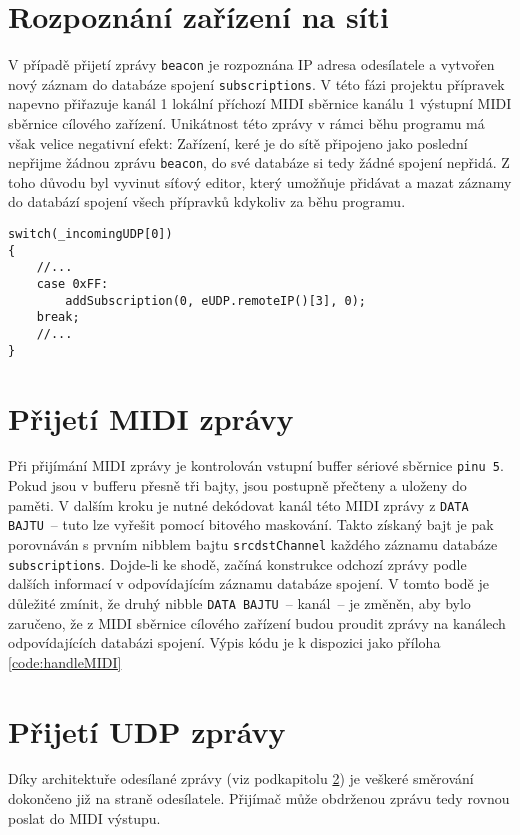 \section{Rozpoznání zařízení na síti}
V případě přijetí zprávy \texttt{beacon} je rozpoznána IP adresa odesílatele a vytvořen nový záznam do databáze spojení \texttt{sub\-scrip\-tions}. V této fázi projektu přípravek napevno přiřazuje kanál 1  lokální příchozí \acs{MIDI} sběrnice kanálu 1 výstupní \acs{MIDI} sběrnice cílového zařízení. Unikátnost této zprávy v rámci běhu programu má však velice negativní efekt: Zařízení, keré je do sítě připojeno jako poslední nepřijme žádnou zprávu \texttt{beacon}, do své databáze si tedy žádné spojení nepřidá. Z toho důvodu byl vyvinut síťový editor, který umožňuje přidávat a mazat záznamy do databází spojení všech přípravků kdykoliv za běhu programu. 
\begin{lstlisting}
switch(_incomingUDP[0])
{
    //...
    case 0xFF:
        addSubscription(0, eUDP.remoteIP()[3], 0);
    break;
    //...
}
\end{lstlisting}

\section{Přijetí \acs{MIDI} zprávy}\label{chpt:PrijMIDI}
Při přijímání \acs{MIDI} zprávy je kontrolován vstupní buffer sériové sběrnice \texttt{pinu 5}. Pokud jsou v bufferu přesně tři bajty, jsou postupně přečteny a uloženy do paměti. V dalším kroku je nutné dekódovat kanál této \acs{MIDI} zprávy z \texttt{DATA BAJTU}~-- tuto  lze vyřešit pomocí bitového maskování. Takto získaný bajt je pak porovnáván s prvním nibblem bajtu \texttt{srcdstChannel} každého záznamu databáze \texttt{sub\-scrip\-tions}. Dojde-li ke shodě, začíná konstrukce odchozí zprávy podle dalších informací v odpovídajícím záznamu databáze spojení. V tomto bodě je důležité zmínit, že druhý nibble \texttt{DATA BAJTU}~-- kanál~-- je změněn, aby bylo zaručeno, že z \acs{MIDI} sběrnice cílového zařízení budou proudit zprávy na kanálech odpovídajících databázi spojení. Výpis kódu je k dispozici jako příloha \ref{code:handleMIDI}

\section{Přijetí UDP zprávy}
Díky architektuře odesílané zprávy (viz podkapitolu \ref{chpt:PrijMIDI}) je veškeré směrování dokončeno již na straně odesílatele. Přijímač může obdrženou zprávu tedy rovnou poslat do \acs{MIDI} výstupu.



